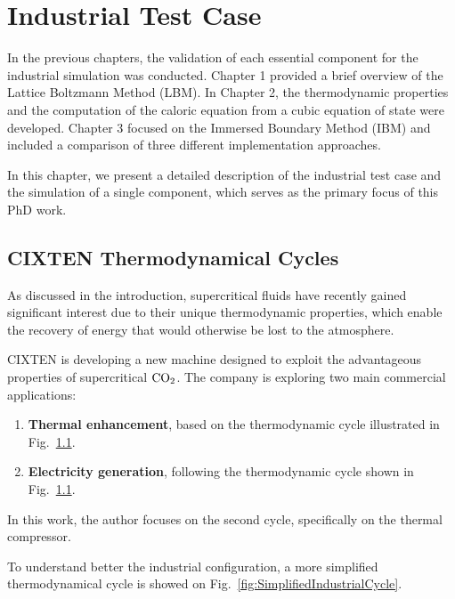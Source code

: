 \chapter{Industrial Test Case}
\chaptertoc{}

In the previous chapters, the validation of each essential component for the
industrial simulation was conducted. Chapter 1 provided a brief overview of the
Lattice Boltzmann Method (LBM). In Chapter 2, the thermodynamic properties and
the computation of the caloric equation from a cubic equation of state were
developed. Chapter 3 focused on the Immersed Boundary Method (IBM) and included
a comparison of three different implementation approaches.

In this chapter, we present a detailed description of the industrial test case
and the simulation of a single component, which serves as the primary focus of
this PhD work.

\section{CIXTEN Thermodynamical Cycles}

As discussed in the introduction, supercritical fluids have recently gained
significant interest due to their unique thermodynamic properties, which enable
the recovery of energy that would otherwise be lost to the atmosphere.

CIXTEN is developing a new machine designed to exploit the advantageous
properties of supercritical $\ce{CO2}$. The company is exploring two main
commercial applications:

\begin{enumerate}
    \item \textbf{Thermal enhancement}, based on the thermodynamic cycle illustrated in Fig.~\ref{}.
    \item \textbf{Electricity generation}, following the thermodynamic cycle shown in Fig.~\ref{}.
\end{enumerate}


In this work, the author focuses on the second cycle, specifically on the
thermal compressor.

To understand better the industrial configuration, a more simplified
thermodynamical cycle is showed on Fig.~\ref{fig:SimplifiedIndustrialCycle}.

